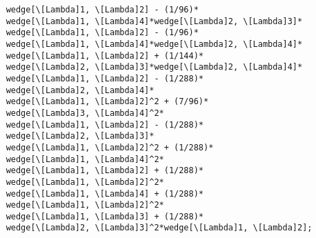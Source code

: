 \documentclass[11pt]{amsart}
\theoremstyle{definition}
\theoremstyle{remark}
\numberwithin{equation}{section}
\begin{document}
\begin{lstlisting}
    wedge[\[Lambda]1, \[Lambda]2] - (1/96)*
    wedge[\[Lambda]1, \[Lambda]4]*wedge[\[Lambda]2, \[Lambda]3]*
    wedge[\[Lambda]1, \[Lambda]2] - (1/96)*
    wedge[\[Lambda]1, \[Lambda]4]*wedge[\[Lambda]2, \[Lambda]4]*
    wedge[\[Lambda]1, \[Lambda]2] + (1/144)*
    wedge[\[Lambda]2, \[Lambda]3]*wedge[\[Lambda]2, \[Lambda]4]*
    wedge[\[Lambda]1, \[Lambda]2] - (1/288)*
    wedge[\[Lambda]2, \[Lambda]4]*
    wedge[\[Lambda]1, \[Lambda]2]^2 + (7/96)*
    wedge[\[Lambda]3, \[Lambda]4]^2*
    wedge[\[Lambda]1, \[Lambda]2] - (1/288)*
    wedge[\[Lambda]2, \[Lambda]3]*
    wedge[\[Lambda]1, \[Lambda]2]^2 + (1/288)*
    wedge[\[Lambda]1, \[Lambda]4]^2*
    wedge[\[Lambda]1, \[Lambda]2] + (1/288)*
    wedge[\[Lambda]1, \[Lambda]2]^2*
    wedge[\[Lambda]1, \[Lambda]4] + (1/288)*
    wedge[\[Lambda]1, \[Lambda]2]^2*
    wedge[\[Lambda]1, \[Lambda]3] + (1/288)*
    wedge[\[Lambda]2, \[Lambda]3]^2*wedge[\[Lambda]1, \[Lambda]2];
\end{lstlisting}



\end{document}
